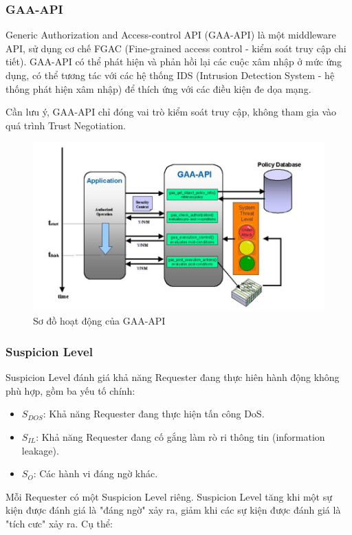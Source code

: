 \documentclass[12pt]{article}
\begin{document}
\subsubsection{GAA-API}
Generic Authorization and Access-control API (GAA-API) là một middleware API, sử dụng cơ chế FGAC (Fine-grained access control - kiểm soát truy cập chi tiết). GAA-API có thể phát hiện và phản hồi lại các cuộc xâm nhập ở mức ứng dụng, có thể tương tác với các hệ thống IDS (Intrusion Detection System - hệ thống phát hiện xâm nhập) để thích ứng với các điều kiện đe dọa mạng.

Cần lưu ý, GAA-API chỉ đóng vai trò kiểm soát truy cập, không tham gia vào quá trình Trust Negotiation.

\begin{figure}[H]
\centering
\includegraphics[scale=.5]{img/gaa-api.png}
\caption{Sơ đồ hoạt động của GAA-API}
\label{fig:gaa-api}
\end{figure}

\subsubsection{Suspicion Level}
Suspicion Level đánh giá khả năng Requester đang thực hiên hành động không phù hợp, gồm ba yếu tố chính:
\begin{itemize}
\item $S_{DOS}$: Khả năng Requester đang thực hiện tấn công DoS.
\item $S_{IL}$: Khả năng Requester đang cố gắng làm rò ri thông tin (information leakage).
\item $S_{O}$: Các hành vi đáng ngờ khác.
\end{itemize}

Mỗi Requester có một Suspicion Level riêng. Suspicion Level tăng khi một sự kiện được đánh giá là "đáng ngờ" xảy ra, giảm khi các sự kiện được đánh giá là "tích cưc" xảy ra. Cụ thể:
\end{document}
